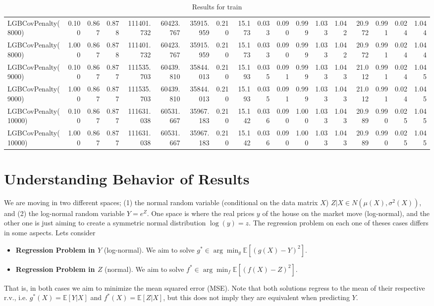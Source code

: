\documentclass[11pt]{article}
\theoremstyle{plain}
\theoremstyle{definition}
\newcommand{\1}{\mathbf{1}}
\newcommand{\Expected}[1]{\mathbb{E}[#1]}
\begin{document}
\begin{table}[htbp]
{\begin{tabular}{lrrrrrrrrrrrrrrrrr}
LGBCovPenalty(8000) & 0.100 & 0.867 & 0.878 & 111401.732 & 60423.767 & 35915.959 & 0.210 & 15.173 & 0.033 & 0.090 & 0.999 & 1.033 & 1.042 & 20.972 & 0.991 & 0.024 & 1.044 \\
LGBCovPenalty(8000) & 1.000 & 0.867 & 0.878 & 111401.732 & 60423.767 & 35915.959 & 0.210 & 15.173 & 0.033 & 0.090 & 0.999 & 1.033 & 1.042 & 20.972 & 0.991 & 0.024 & 1.044 \\
LGBCovPenalty(9000) & 0.100 & 0.867 & 0.877 & 111535.703 & 60439.810 & 35844.013 & 0.210 & 15.193 & 0.035 & 0.091 & 0.999 & 1.033 & 1.043 & 21.012 & 0.991 & 0.024 & 1.045 \\
LGBCovPenalty(9000) & 1.000 & 0.867 & 0.877 & 111535.703 & 60439.810 & 35844.013 & 0.210 & 15.193 & 0.035 & 0.091 & 0.999 & 1.033 & 1.043 & 21.012 & 0.991 & 0.024 & 1.045 \\
LGBCovPenalty(10000) & 0.100 & 0.867 & 0.877 & 111631.038 & 60531.667 & 35967.183 & 0.210 & 15.142 & 0.036 & 0.090 & 1.000 & 1.033 & 1.043 & 20.989 & 0.990 & 0.025 & 1.045 \\
LGBCovPenalty(10000) & 1.000 & 0.867 & 0.877 & 111631.038 & 60531.667 & 35967.183 & 0.210 & 15.142 & 0.036 & 0.090 & 1.000 & 1.033 & 1.043 & 20.989 & 0.990 & 0.025 & 1.045 \\
\bottomrule
\end{tabular}
     }
    \caption{Results for train}
    \label{tab:results_train}
\end{table}

\newpage



\section{Understanding Behavior of Results}

We are moving in two different spaces; (1) the normal random variable (conditional on the data matrix $X$) $Z|X \in N(\mu(X), \sigma^2(X))$, and (2) the log-normal random variable $Y = e^Z$. One space is where the real prices $y$ of the  house on the market move (log-normal), and the other one is just aiming to create a symmetric normal distribution $\log(y)=z$. The regression problem on each one of theses cases differs in some aspects. Lets consider 
\begin{itemize}
    \item \textbf{Regression Problem in $Y$} (log-normal). We aim to solve $g^* \in \arg\min_g \Expected{(g(X)-Y)^2}$. 
    \item 
\textbf{Regression Problem in $Z$} (normal). We aim to solve $f^* \in \arg\min_f \Expected{(f(X)-Z)^2}$.
\end{itemize}
 That is, in both cases we aim to minimize the mean squared error (MSE). Note that both solutions regress to the mean of their respective r.v., i.e. $g^*(X)=\Expected{Y | X}$ and $f^*(X)=\Expected{Z | X}$, but this does not imply they are equivalent when predicting $Y$. 
\end{document}
